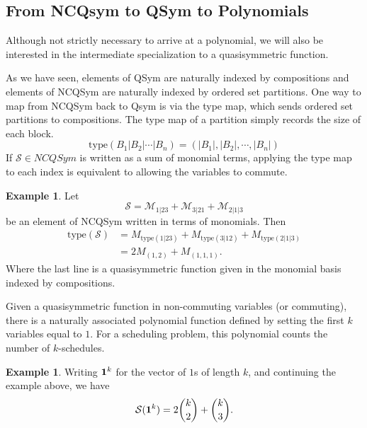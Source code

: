 \documentclass[12pt,reqno]{amsart}
\numberwithin{definition}{section}
\newtheorem{remark}[definition]{Remark}
\theoremstyle{definition}
\newtheorem{example}[definition]{Example}
\newcommand{\ncM}{\mathcal{M}}
\begin{document}


\subsection{From NCQsym to QSym to Polynomials}
Although not strictly necessary to arrive at a polynomial, we will also be interested in the intermediate specialization to a quasisymmetric function.  


As we have seen, elements of QSym are naturally indexed by
compositions and elements of NCQSym are naturally indexed by ordered
set partitions.  
One way to map from NCQSym back to Qsym is via the type map, which sends ordered set partitions to compositions.
The type map of a partition simply records the size of each block.
$$\textrm{type}(B_1|B_2|\cdots|B_n) = (|B_1|, |B_2|, \cdots, |B_n|)$$
If $\mathcal{S} \in NCQSym$ is written as a sum of monomial terms,
applying the type map to each index is equivalent to allowing the
variables to commute.

\begin{example}
Let $$\mathcal{S} = \ncM_{1|23} + \ncM_{3|21} + \ncM_{2|1|3}$$ be an element of NCQSym written in terms of monomials.  Then 
\begin{align*}
\textrm{type}(\mathcal{S}) & =  M_{\textrm{type} (1|23)} + M_{\textrm{type} (3|12)} + M_{\textrm{type} (2|1|3)} \\
&  = 2 M_{(1,2)} + M_{(1,1,1)}.
\end{align*}
 Where the last line is a quasisymmetric function given in the monomial basis indexed by compositions.  
\end{example}



Given a quasisymmetric function in non-commuting variables (or
commuting), there is a naturally associated polynomial function
defined by setting the first $k$ variables equal to $1$.  For a scheduling problem, this polynomial counts the number of $k$-schedules.  

\begin{example}
Writing ${\bf 1}^k$ for the vector of $1$s of length $k$, and continuing the example above, we have 
$$ \mathcal{S}({\bf 1}^k) = 2 {k \choose 2} + {k \choose 3}.$$  
\end{example}
\end{document}
